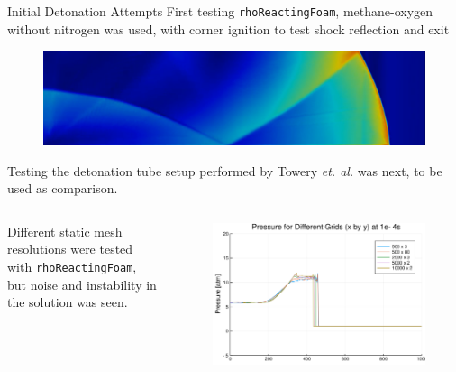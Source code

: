 \begin{frame}[allowframebreaks]{Initial Detonation Attempts}
First testing \texttt{rhoReactingFoam}, methane-oxygen without nitrogen was used, with corner ignition to test shock reflection and exit 
\begin{figure}[]
\centering
\includegraphics[width=\textwidth]{../figs/cornerdet.png}
\end{figure}%
Testing the detonation tube setup performed by Towery \textit{et. al.} \cite{towery1} was next, to be used as comparison. 

\newpage

\begin{columns}
Different static mesh resolutions were tested with \texttt{rhoReactingFoam}, but noise and instability in the solution was seen.
\begin{figure}[]
\centering
\includegraphics[width=\textwidth]{../figs/rhoReactingFoam.png}
\end{figure}%
\end{columns}
\newpage


\end{frame}
